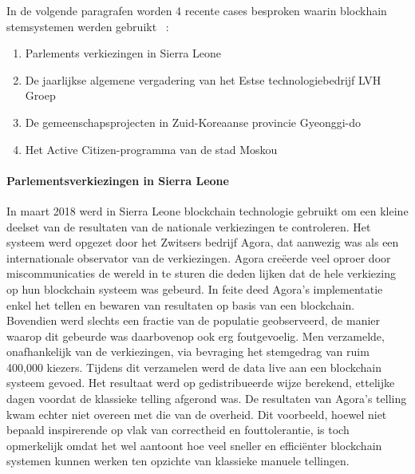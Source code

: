 			In de volgende paragrafen worden 4 recente cases besproken waarin blockhain stemsystemen werden gebruikt ~\autocite{Kshetri2018}:
			\begin{enumerate}
				\item Parlements verkiezingen in Sierra Leone
				\item De jaarlijkse algemene vergadering van het Estse technologiebedrijf LVH Groep
				\item De gemeenschapsprojecten in Zuid-Koreaanse provincie Gyeonggi-do
				\item Het Active Citizen-programma van de stad Moskou
			\end{enumerate}
				
				\paragraph{Parlementsverkiezingen in Sierra Leone}
				In maart 2018 werd in Sierra Leone blockchain technologie gebruikt om een kleine deelset van de resultaten van de nationale verkiezingen te controleren. Het systeem werd opgezet door het Zwitsers bedrijf Agora, dat aanwezig was als een internationale observator van de verkiezingen. Agora creëerde veel oproer door miscommunicaties de wereld in te sturen die  deden lijken dat de hele verkiezing op hun blockchain systeem was gebeurd. In feite deed Agora's implementatie enkel het tellen en bewaren van resultaten op basis van een blockchain. Bovendien werd slechts een fractie van de populatie geobserveerd, de manier waarop dit gebeurde was daarbovenop ook erg foutgevoelig. Men verzamelde, onafhankelijk van de verkiezingen, via bevraging het stemgedrag van ruim 400,000 kiezers. Tijdens dit verzamelen werd de data live aan een blockchain systeem gevoed. Het resultaat werd op gedistribueerde wijze berekend, ettelijke dagen voordat de klassieke telling afgerond was. De resultaten van Agora's telling kwam echter niet overeen met die van de overheid. Dit voorbeeld, hoewel niet bepaald  inspirerende op vlak van correctheid en fouttolerantie, is toch opmerkelijk omdat het wel aantoont hoe veel sneller en efficiënter blockchain systemen kunnen werken ten opzichte van klassieke manuele tellingen. ~\autocite{Kshetri2018}
				
